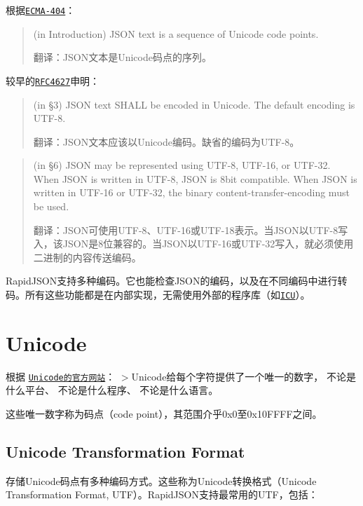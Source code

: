 根据\href{http://www.ecma-international.org/publications/files/ECMA-ST/ECMA-404.pdf}{\tt E\+C\+M\+A-\/404}：

\begin{quote}
(in Introduction) J\+S\+ON text is a sequence of Unicode code points.

翻译：\+J\+S\+O\+N文本是\+Unicode码点的序列。 \end{quote}


较早的\href{http://www.ietf.org/rfc/rfc4627.txt}{\tt R\+F\+C4627}申明：

\begin{quote}
(in §3) J\+S\+ON text S\+H\+A\+LL be encoded in Unicode. The default encoding is U\+T\+F-\/8.

翻译：\+J\+S\+O\+N文本应该以\+Unicode编码。缺省的编码为\+U\+T\+F-\/8。 \end{quote}


\begin{quote}
(in §6) J\+S\+ON may be represented using U\+T\+F-\/8, U\+T\+F-\/16, or U\+T\+F-\/32. When J\+S\+ON is written in U\+T\+F-\/8, J\+S\+ON is 8bit compatible. When J\+S\+ON is written in U\+T\+F-\/16 or U\+T\+F-\/32, the binary content-\/transfer-\/encoding must be used.

翻译：\+J\+S\+O\+N可使用\+U\+T\+F-\/8、\+U\+T\+F-\/16或\+U\+T\+F-\/18表示。当\+J\+S\+O\+N以\+U\+T\+F-\/8写入，该\+J\+S\+O\+N是8位兼容的。当\+J\+S\+O\+N以\+U\+T\+F-\/16或\+U\+T\+F-\/32写入，就必须使用二进制的内容传送编码。 \end{quote}


Rapid\+J\+S\+O\+N支持多种编码。它也能检查\+J\+S\+O\+N的编码，以及在不同编码中进行转码。所有这些功能都是在内部实现，无需使用外部的程序库（如\href{http://site.icu-project.org/}{\tt I\+CU}）。\hypertarget{md_Commun_Externe_RapidJSON_doc_encoding.zh-cn_Unicode}{}\section{Unicode}\label{md_Commun_Externe_RapidJSON_doc_encoding.zh-cn_Unicode}
根据 \href{http://www.unicode.org/standard/translations/t-chinese.html}{\tt Unicode的官方网站}： $>$Unicode给每个字符提供了一个唯一的数字， 不论是什么平台、 不论是什么程序、 不论是什么语言。

这些唯一数字称为码点（code point），其范围介乎{\ttfamily 0x0}至{\ttfamily 0x10\+F\+F\+FF}之间。\hypertarget{md_Commun_Externe_RapidJSON_doc_encoding.zh-cn_UTF}{}\subsection{Unicode Transformation Format}\label{md_Commun_Externe_RapidJSON_doc_encoding.zh-cn_UTF}
存储\+Unicode码点有多种编码方式。这些称为\+Unicode转换格式（\+Unicode Transformation Format, U\+T\+F）。\+Rapid\+J\+S\+O\+N支持最常用的\+U\+T\+F，包括：


